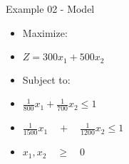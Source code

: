 \begin{frame}{Example 02 - Model}

\begin{itemize}
\item{Maximize: \\}
\item{$Z=300x_1+ 500x_2$ \\}
\item{Subject to: \\}
\item{$\frac { 1 }{ 800 } x_{ 1 } + \frac { 1 }{ 700 } x_{ 2 } \le 1$\\}
\item{$ \frac { 1 }{ 1500 } x_{ 1 }\quad +\quad \frac { 1 }{ 1200 } x_{ 2 }\le 1$\\}
\item{$x_{ 1 },x_{ 2 }\quad \ge \quad 0$\\}
\end{itemize}

\end{frame}

